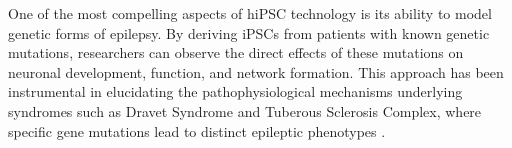 \documentclass[10pt]{article}
\begin{document}
\begin{sloppypar}




  One of the most compelling aspects of hiPSC technology is its ability to model genetic forms of epilepsy. By deriving iPSCs from patients with known genetic mutations, researchers can observe the direct effects of these mutations on neuronal development, function, and network formation. This approach has been instrumental in elucidating the pathophysiological mechanisms underlying syndromes such as Dravet Syndrome and Tuberous Sclerosis Complex, where specific gene mutations lead to distinct epileptic phenotypes \citep{jiao_modeling_2013, nadadhur_neuronal_2019}.


\end{sloppypar}
\end{document}
